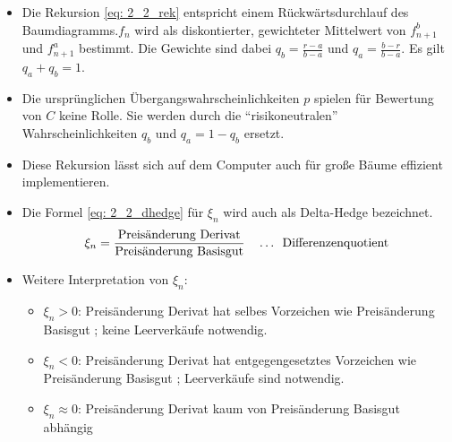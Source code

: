 \begin{*bemerkung}
	\begin{itemize}[leftmargin=*, label=$\bullet$, nolistsep]
		\item Die Rekursion \eqref{eq: 2_2_rek} entspricht einem Rückwärtsdurchlauf des Baumdiagramms.$f_n$ wird als diskontierter, gewichteter Mittelwert von $f_{n+1}^b$ und $f_{n+1}^a$ bestimmt. Die Gewichte sind dabei $q_b = \frac{r-a}{b-a}$ und $q_a = \frac{b-r}{b-a}$. Es gilt $q_a + q_b = 1$.
		\item Die ursprünglichen Übergangswahrscheinlichkeiten $p$ spielen für Bewertung von $C$ keine Rolle. Sie werden durch die \enquote{risikoneutralen} Wahrscheinlichkeiten $q_b$ und $q_a = 1 - q_b$ ersetzt.
		\item Diese Rekursion lässt sich auf dem Computer auch für große Bäume effizient implementieren.
		\item Die Formel \eqref{eq: 2_2_dhedge} für $\xi_n$ wird auch als Delta-Hedge bezeichnet.
		\begin{equation*}
			\xi_n = \frac{\text{Preisänderung Derivat}}{\text{Preisänderung Basisgut}} \quad \dots \enskip \text{Differenzenquotient}
		\end{equation*}
		\item Weitere Interpretation von $\xi_n$:
		\begin{itemize}
			\item $\xi_n > 0$: Preisänderung Derivat hat selbes Vorzeichen wie Preisänderung Basisgut ; keine Leerverkäufe notwendig.
			\item $\xi_n < 0$: Preisänderung Derivat hat entgegengesetztes Vorzeichen wie Preisänderung Basisgut ; Leerverkäufe sind notwendig.
			\item $\xi_n \approx 0$: Preisänderung Derivat kaum von Preisänderung Basisgut abhängig
		\end{itemize}
	\end{itemize}
\end{*bemerkung}

